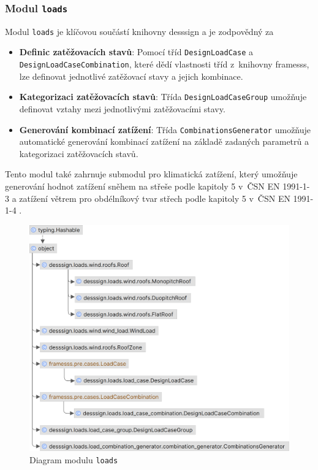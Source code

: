 \subsubsection*{Modul \texttt{loads}}
Modul \texttt{loads} je klíčovou součástí knihovny desssign a je zodpovědný za
\begin{itemize}
    \item \textbf{Definic zatěžovacích stavů}:  Pomocí tříd \texttt{DesignLoadCase} a \texttt{DesignLoadCaseCombination}, které dědí vlastnosti tříd z~knihovny framesss, lze definovat jednotlivé zatěžovací stavy a jejich kombinace.
    \item \textbf{Kategorizaci zatěžovacích stavů}: Třída \texttt{DesignLoadCaseGroup} umožňuje definovat vztahy mezi jednotlivými zatěžovacími stavy.
    \item \textbf{Generování kombinací zatížení}: Třída \texttt{CombinationsGenerator} umožňuje automatické generování kombinací zatížení na základě zadaných parametrů a kategorizaci zatěžovacích stavů.
\end{itemize}

Tento modul také zahrnuje submodul pro klimatická zatížení, který umožňuje generování hodnot zatížení sněhem na střeše podle kapitoly 5 v~ČSN EN 1991-1-3 \cite{EN1991_1_3} a zatížení větrem pro obdélníkový tvar střech podle kapitoly 5 v~ČSN EN 1991-1-4 \cite{EN1991_1_4}.

\begin{figure}[H]
    \includegraphics{assets/figures/desssign/loads_uml.png}
    \caption{Diagram modulu \texttt{loads}}
    \label{fig:modul_loads}
\end{figure}

